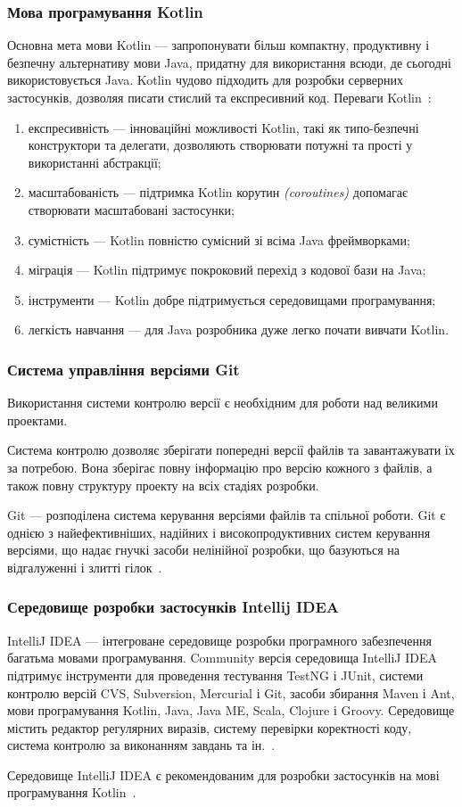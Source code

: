 \subsubsection{Мова програмування Kotlin}
Основна мета мови Kotlin --- запропонувати більш компактну, продуктивну і безпечну альтернативу мови Java, придатну для використання всюди, де сьогодні використовується Java.
Kotlin чудово підходить для розробки серверних застосунків, дозволяя писати стислий та експресивний код.
Переваги Kotlin~\cite{kotlin,Panchal2017}:  
\begin{enumerate}[label={\arabic*)}]
	\item експресивність --- інноваційні можливості Kotlin, такі як типо-безпечні конструктори та делегати, дозволяють створювати потужні та прості у використанні абстракції;
	\item масштабованість --- підтримка Kotlin корутин \textit{(coroutines)} допомагає створювати масштабовані застосунки;
	\item сумістність --- Kotlin повністю сумісний зі всіма Java фреймворками;
	\item міграція --- Kotlin підтримує покроковий перехід з кодової бази на Java;
	\item інструменти --- Kotlin добре підтримується середовищами програмування;
	\item легкість навчання --- для Java розробника дуже легко почати вивчати Kotlin.
\end{enumerate}

\subsubsection{Система управління версіями Git}
Використання системи контролю версії є необхідним для роботи над великими проектами.

Система контролю дозволяє зберігати попередні версії файлів та завантажувати їх за потребою. 
Вона зберігає повну інформацію про версію кожного з файлів, а також повну структуру проекту на всіх стадіях розробки.

Git --- розподілена система керування версіями файлів та спільної роботи. Git є однією з найефективніших, надійних і високопродуктивних систем керування версіями, що надає гнучкі засоби нелінійної розробки, що базуються на відгалуженні і злитті гілок~\cite{Chacon2009}.

\subsubsection{Середовище розробки застосунків Intellij IDEA}
IntelliJ IDEA --- інтегроване середовище розробки програмного забезпечення багатьма мовами програмування. 
Community версія середовища IntelliJ IDEA підтримує інструменти для проведення тестування TestNG і JUnit, системи контролю версій CVS, Subversion, Mercurial і Git, засоби збирання Maven і Ant, мови програмування Kotlin, Java, Java ME, Scala, Clojure і Groovy. 
Середовище містить редактор регулярних виразів, систему перевірки коректності коду, система контролю за виконанням завдань та ін.~\cite{Kalinichenko2013}.

Середовище IntelliJ IDEA є рекомендованим для розробки застосунків на мові програмування Kotlin~\cite{kotlin}.


